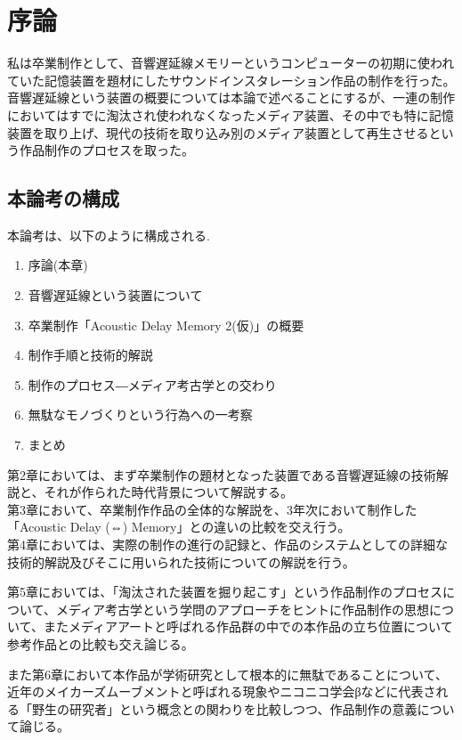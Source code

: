\chapter{序論}\label{ux5e8fux8ad6}

私は卒業制作として、音響遅延線メモリーというコンピューターの初期に使われていた記憶装置を題材にしたサウンドインスタレーション作品の制作を行った。\\
音響遅延線という装置の概要については本論で述べることにするが、一連の制作においてはすでに淘汰され使われなくなったメディア装置、その中でも特に記憶装置を取り上げ、現代の技術を取り込み別のメディア装置として再生させるという作品制作のプロセスを取った。

\section{本論考の構成}\label{ux672cux8ad6ux8003ux306eux69cbux6210}

本論考は、以下のように構成される.

\begin{enumerate}
\def\labelenumi{\arabic{enumi}.}
\tightlist
\item
  序論(本章)
\item
  音響遅延線という装置について
\item
  卒業制作「Acoustic Delay Memory 2(仮)」の概要
\item
  制作手順と技術的解説
\item
  制作のプロセス―メディア考古学との交わり
\item
  無駄なモノづくりという行為への一考察
\item
  まとめ
\end{enumerate}

第2章においては、まず卒業制作の題材となった装置である音響遅延線の技術解説と、それが作られた時代背景について解説する。\\
第3章において、卒業制作作品の全体的な解説を、3年次において制作した「Acoustic
Delay (⇔) Memory」との違いの比較を交え行う。\\
第4章においては、実際の制作の進行の記録と、作品のシステムとしての詳細な技術的解説及びそこに用いられた技術についての解説を行う。

第5章においては、「淘汰された装置を掘り起こす」という作品制作のプロセスについて、メディア考古学という学問のアプローチをヒントに作品制作の思想について、またメディアアートと呼ばれる作品群の中での本作品の立ち位置について参考作品との比較も交え論じる。

また第6章において本作品が学術研究として根本的に無駄であることについて、近年のメイカーズムーブメントと呼ばれる現象やニコニコ学会βなどに代表される「野生の研究者」という概念との関わりを比較しつつ、作品制作の意義について論じる。

